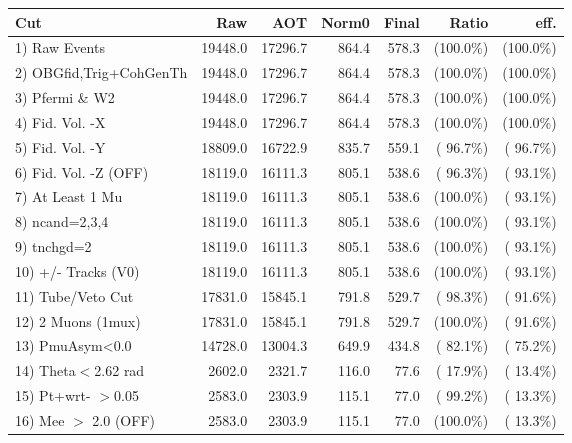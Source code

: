  \begin{table}[h!]\centering
 \begin{tabular}{||l||r|r|r|r|r|r||}
 \hline
 \hline
 Cut & Raw & AOT & Norm0 & Final & Ratio & eff.       \\
 \hline
  1) Raw Events           &      19448.0 &      17296.7 &        864.4 &        578.3 & (100.0\%) & (100.0\%) \\
  2) OBGfid,Trig+CohGenTh &      19448.0 &      17296.7 &        864.4 &        578.3 & (100.0\%) & (100.0\%) \\
  3) Pfermi \& W2         &      19448.0 &      17296.7 &        864.4 &        578.3 & (100.0\%) & (100.0\%) \\
  4) Fid. Vol. -X         &      19448.0 &      17296.7 &        864.4 &        578.3 & (100.0\%) & (100.0\%) \\
  5) Fid. Vol. -Y         &      18809.0 &      16722.9 &        835.7 &        559.1 & ( 96.7\%) & ( 96.7\%) \\
  6) Fid. Vol. -Z (OFF)   &      18119.0 &      16111.3 &        805.1 &        538.6 & ( 96.3\%) & ( 93.1\%) \\
  7) At Least 1 Mu        &      18119.0 &      16111.3 &        805.1 &        538.6 & (100.0\%) & ( 93.1\%) \\
  8) ncand=2,3,4          &      18119.0 &      16111.3 &        805.1 &        538.6 & (100.0\%) & ( 93.1\%) \\
  9) tnchgd=2             &      18119.0 &      16111.3 &        805.1 &        538.6 & (100.0\%) & ( 93.1\%) \\
 10) +/- Tracks (V0)      &      18119.0 &      16111.3 &        805.1 &        538.6 & (100.0\%) & ( 93.1\%) \\
 11) Tube/Veto Cut        &      17831.0 &      15845.1 &        791.8 &        529.7 & ( 98.3\%) & ( 91.6\%) \\
 12) 2 Muons (1mux)       &      17831.0 &      15845.1 &        791.8 &        529.7 & (100.0\%) & ( 91.6\%) \\
 13) PmuAsym<0.0          &      14728.0 &      13004.3 &        649.9 &        434.8 & ( 82.1\%) & ( 75.2\%) \\
 14) Theta$<$2.62 rad     &       2602.0 &       2321.7 &        116.0 &         77.6 & ( 17.9\%) & ( 13.4\%) \\
 15) Pt+wrt- $>$0.05      &       2583.0 &       2303.9 &        115.1 &         77.0 & ( 99.2\%) & ( 13.3\%) \\
 16) Mee $>$ 2.0  (OFF)   &       2583.0 &       2303.9 &        115.1 &         77.0 & (100.0\%) & ( 13.3\%) \\

\end{tabular}
\end{table}
